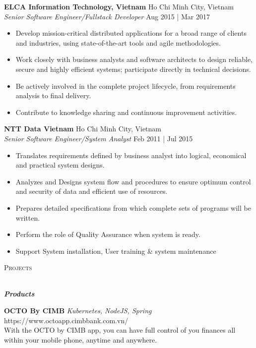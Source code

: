 \documentclass[a4paper]{article}
\newcommand{\lineunder} {
    \vspace*{-8pt} \\
    \hspace*{-18pt} \hrulefill \\
}
\newcommand{\header} [1] {
    {\hspace*{-18pt}\vspace*{6pt} \textsc{#1}}
    \vspace*{-6pt} \lineunder
}
\begin{document}
\textbf{ELCA Information Technology, Vietnam} \hfill Ho Chi Minh City, Vietnam\\
\textit{Senior Software Engineer/Fullstack Developer} \hfill Aug 2015 | Mar 2017\\
\vspace{-1mm}
\begin{itemize} \itemsep 1pt
	\item Develop mission-critical distributed applications for a broad range of clients and industries, using state-of-the-art tools and agile methodologies.
	\item Work closely with business analysts and software architects to design reliable, secure and highly efficient systems; participate directly in technical decisions.
	\item Be actively involved in the complete project lifecycle, from requirements analysis to final delivery.
	\item Contribute to knowledge sharing and continuous improvement activities.
\end{itemize}

\textbf{NTT Data Vietnam} \hfill Ho Chi Minh City, Vietnam\\
\textit{Senior Software Engineer/System Analyst} \hfill Feb 2011 | Jul 2015\\
\vspace{-1mm}
\begin{itemize} \itemsep 1pt
	\item Translates requirements defined by business analyst into logical, economical and practical system designs.
	\item Analyzes and Designs system flow and procedures to ensure optimum control and security of data and efficient use of resources.
	\item Prepares detailed specifications from which complete sets of programs will be written.
	\item Perform the role of Quality Assurance when system is ready.
	\item Support System installation, User training \& system maintenance
\end{itemize}

\header{Projects}
\begin{center}
	\textbf{\textit{Products}}
\end{center}

{\textbf{OCTO By CIMB}} {\sl Kubernetes, NodeJS, Spring} \hfill https://www.octoapp.cimbbank.com.vn/\\
With the OCTO by CIMB app, you can have full control of you finances all within your mobile phone, anytime and anywhere.\\
\vspace*{2mm}
\end{document}
